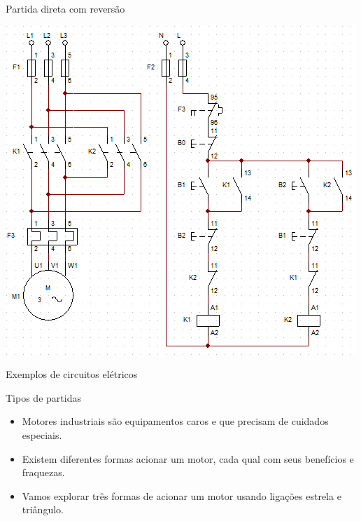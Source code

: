 \begin{frame}{Partida direta com reversão}
\centerline{\includegraphics[height=0.9\textheight]{Figuras/Ch07/fig14.jpg}}
\end{frame}


\begin{frame}{Exemplos de circuitos elétricos}
\begin{block}{Tipos de partidas}
\begin{itemize}
    \item Motores industriais são equipamentos caros e que precisam de cuidados especiais.
    \item Existem diferentes formas acionar um motor, cada qual com seus benefícios e fraquezas.
    \item Vamos explorar três formas de acionar um motor usando ligações estrela e triângulo.
\end{itemize}
\end{block}
\end{frame}


